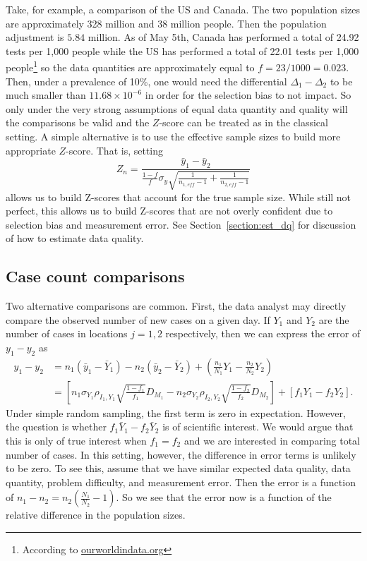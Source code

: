 \documentclass[aoas]{amsart}
\begin{document}
Take, for example, a comparison of the US and Canada.  The two population sizes are approximately 328 million and 38 million people.  Then the population adjustment is $5.84$ million. As of May 5th, Canada has performed a total of 24.92 tests per 1,000 people while the US has performed a total of 22.01 tests per 1,000 people\footnote{According to \href{https://ourworldindata.org/grapher/full-list-cumulative-total-tests-per-thousand}{ourworldindata.org}} so the data quantities are approximately equal to $f = 23/1000 = 0.023$.  Then, under a prevalence of 10\%, one would need the differential $\Delta_1-\Delta_2$ to be much smaller than $11.68 \times 10^{-6}$ in order for the selection bias to not impact.  So only under the very strong assumptions of equal data quantity and quality will the comparisons be valid and the $Z$-score can be treated as in the classical setting.  A simple alternative is to use the effective sample sizes to build more appropriate $Z$-score.  That is, setting
$$
Z_n = \frac{\bar y_1 - \bar y_2}{ \frac{1-f}{f} \sigma_y \sqrt{ \frac{1}{n_{1,eff} - 1} + \frac{1}{n_{2,eff} - 1}}}
$$
allows us to build Z-scores that account for the true sample size.  While still not perfect, this allows us to build Z-scores that are not overly confident due to selection bias and measurement error.  See Section~\ref{section:est_dq} for discussion of how to estimate data quality.

\subsection{Case count comparisons}
Two alternative comparisons are common. First, the data analyst may directly compare the observed number of new cases on a given day.  If $Y_1$ and $Y_2$ are the number of cases in locations $j=1,2$ respectively, then we can express the error of $y_1 - y_2$ as
$$
\begin{aligned}
y_1 - y_2 &= n_1 ( \bar y_1 - \bar Y_{1}) - n_2 ( \bar y_2 - \bar Y_{2}) + \left( \frac{n_1}{N_1} Y_{1} - \frac{n_2}{N_2} Y_2  \right) \\
&= \left[ n_1 \sigma_{Y_1} \rho_{I_1, Y_1} \sqrt{\frac{1-f_1}{f_1}} D_{M_1} - n_2 \sigma_{Y_2} \rho_{I_2, Y_2} \sqrt{\frac{1-f_2}{f_2}} D_{M_2}  \right] + \left[ f_1 Y_1 - f_2 Y_2 \right].
\end{aligned}
$$
Under simple random sampling, the first term is zero in expectation.  However, the question is whether $f_1 \bar Y_1 - f_2 \bar Y_2$ is of scientific interest.  We would argue that this is only of true interest when $f_1 = f_2$ and we are interested in comparing total number of cases.  In this setting, however, the difference in error terms is unlikely to be zero.  To see this, assume that we have similar expected data quality, data quantity, problem difficulty, and measurement error.  Then the error is a function of $n_1 - n_2 = n_2 \left( \frac{N_1}{N_2} - 1 \right)$.  So we see that the error now is a function of the relative difference in the population sizes.
\end{document}
